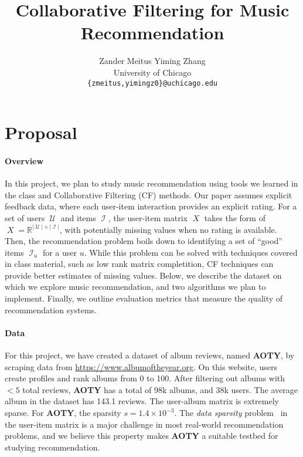 \documentclass{article}
\title{Collaborative Filtering for Music Recommendation}
\author{
  Zander Meitus \qquad Yiming Zhang \\
  University of Chicago \\
  \texttt{\{zmeitus,yimingz0\}@uchicago.edu}
}
\newcommand{\aoty}{{\bf AOTY}\xspace}
\DeclareMathOperator{\X}{\mathit{X}}
\DeclareMathOperator{\U}{\mathcal{U}}
\DeclareMathOperator{\I}{\mathcal{I}}
\newcommand{\card}[1]{\ensuremath{\lvert {#1} \rvert}}
\begin{document}
\maketitle

\section{Proposal}


\paragraph{Overview}
In this project, we plan to study music recommendation using tools we learned
 in the class and Collaborative Filtering (CF) methods.
Our paper assumes explicit feedback data, where each user-item interaction
provides an explicit rating.
For a set of users $\U$ and items $\I$, the user-item matrix $\X$ takes the
form of $\X = \mathbb{R}^{\card{\U} \times \card{\I}}$, with potentially
missing values when no rating is available.
Then, the recommendation problem boils down to identifying a set of ``good''
items $\I_u$ for a user $u$. While this problem can be solved with techniques covered in
class material, such as low rank matrix completition, 
CF techniques can provide better estimates of missing values.
Below, we describe the dataset on which we explore music recommendation, and two
algorithms we plan to implement. Finally, we outline evaluation metrics that measure the
quality of recommendation systems.

\paragraph*{Data}
For this project, we have created a dataset of album reviews, named \aoty, by
 scraping data from \url{https://www.albumoftheyear.org}.
On this website, users create profiles and rank albums from 0 to 100.
After filtering out albums with $<5$ total reviews, \aoty has a total of 98k
 albums, and 38k users.
The average album in the dataset has 143.1 reviews.
The user-album matrix is extremely sparse.
For \aoty, the sparsity $s = 1.4 \times 10^{-3}$.
The {\em data sparsity} problem~\citep{suSurveyCollaborativeFiltering2009} in
 the user-item matrix is a major challenge in most real-world recommendation
 problems, and we believe this property makes \aoty a suitable testbed for
 studying recommendation.
\end{document}
